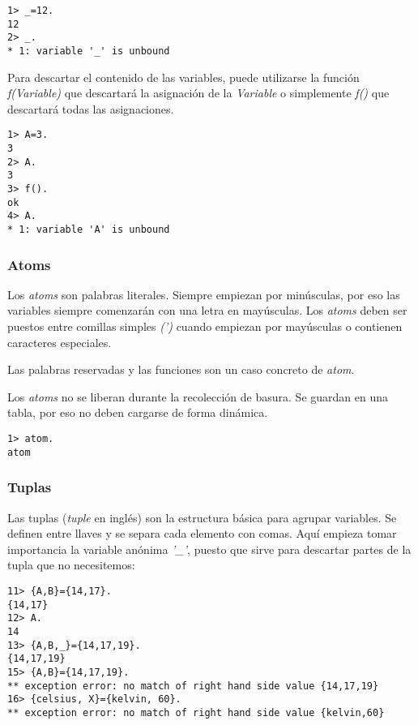 \begin{lstlisting}
1> _=12.
12
2> _.
* 1: variable '_' is unbound
\end{lstlisting}

Para descartar el contenido de las variables, puede utilizarse la función \textit{f(Variable)} que descartará
la asignación de la \textit{Variable} o simplemente \textit{f()} que descartará todas las asignaciones.

\begin{lstlisting}
1> A=3.
3
2> A.
3
3> f().
ok
4> A.
* 1: variable 'A' is unbound
\end{lstlisting}

\subsubsection{Atoms}

Los \textit{atoms} son palabras literales. Siempre empiezan por minúsculas, por eso las variables siempre
comenzarán con una letra en mayúsculas. Los \textit{atoms} deben ser puestos entre comillas simples
\textit{(')} cuando empiezan por mayúsculas o contienen caracteres especiales.

Las palabras reservadas y las funciones son un caso concreto de \textit{atom}.

Los \textit{atoms} no se liberan durante la recolección de basura. Se guardan en una tabla, por eso no deben
cargarse de forma dinámica.

\begin{lstlisting}
1> atom.
atom
\end{lstlisting}



\subsubsection{Tuplas}

Las tuplas (\textit{tuple} en inglés) son la estructura básica para agrupar variables. Se definen entre
llaves y se separa cada elemento con comas. Aquí empieza tomar importancia la variable anónima \textit{'_'},
puesto que sirve para descartar partes de la tupla que no necesitemos:

\begin{lstlisting}
11> {A,B}={14,17}.
{14,17}
12> A.
14
13> {A,B,_}={14,17,19}.
{14,17,19}
15> {A,B}={14,17,19}.
** exception error: no match of right hand side value {14,17,19}
16> {celsius, X}={kelvin, 60}.
** exception error: no match of right hand side value {kelvin,60}
\end{lstlisting}

